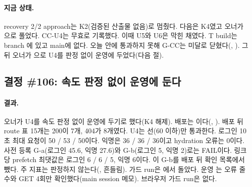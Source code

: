 \paragraph{지금 상태.}
recovery 2/2 approach는 K2(검증된 산출물 없음)로 멈췄다. 다음은 K4였고 오너가 으로 풀었다.
CC-U4는 무효로 기록했다. 이때 U5와 U6은 막힌 채였다.
T build는 branch 에 있고 main에 없다.
오늘 안에 통과하지 못해 G-CC는 미달로 닫혔다(, ).
그 뒤 오너가 으로 U4를 판정 없이 운영에 두었다(다음 절).

\subsection{결정 \#106: 속도 판정 없이 운영에 둔다}\label{sec:re-u4-o}

\paragraph{결과.}
오너가 U4를 속도 판정 없이 운영에 두기로 했다(K4 해제). 배포는 이다(, ).
배포 뒤 route 표 15개는 200이 7개, 404가 8개였다.
U4는  선(60 이하)만 통과한다. 로그인 10초 최대 요청이 50 / 53 / 50이다. 익명은 36 / 36 / 36이고 hydration 오류는 0이다.
사전 등록 G-a(로그인 45.6, 익명 27.6)와 G-b(로그인 5, 익명 2)로는 FAIL이다. 링크당 prefetch 최댓값은 로그인 6 / 6 / 5, 익명 6이다.
이 G-b를 배포 뒤 확인 목록에서 뺐다. 주 지표는 판정하지 않는다(, 흔들림).
가드 run은 에서 돌았다. 운영 는 오류 줄 수와 \code{/} GET 4회만 확인했다(main session 메모). 브라우저 가드 run은 없다.

